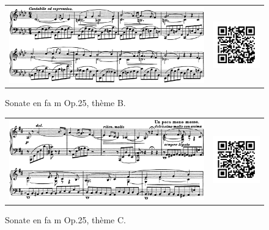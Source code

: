 \begin{figure}[!p]
  \begin{bigcenter}
    \begin{tabular}{lr}
      \includegraphics[width=12.5cm, keepaspectratio]{sonate-theme-B.png}
      &
      \includegraphics[width=3cm, keepaspectratio]{op1-qr.png}
    \end{tabular}
  \end{bigcenter}
  \caption{\label{sonate-theme-2}Sonate en fa m Op.25, thème B.}
\end{figure}

\begin{figure}[!p]
  \begin{bigcenter}
    \begin{tabular}{lr}
      \includegraphics[width=12.5cm, keepaspectratio]{sonate-theme-C.png}
      &
      \includegraphics[width=3cm, keepaspectratio]{op1-qr.png}
    \end{tabular}
  \end{bigcenter}
  \caption{\label{sonate-theme-3}Sonate en fa m Op.25, thème C.}
\end{figure}

